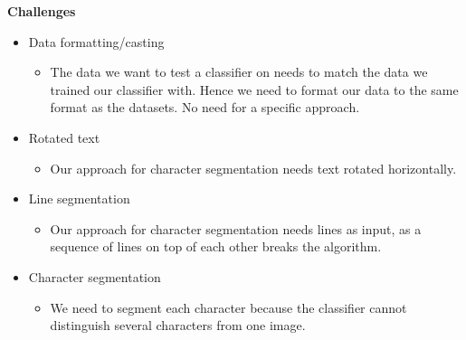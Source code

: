 \documentclass[Report.tex]{subfiles}
\begin{document}
\begin{flushleft}
  \textbf{Challenges}
  \begin{itemize}
    \item{Data formatting/casting}
    \begin{itemize}
      \item{The data we want to test a classifier on needs to match the data we trained our classifier with. Hence we need to format our data to the same format as the datasets. No need for a specific approach.}
    \end{itemize}
    \item{Rotated text}
    \begin{itemize}
      \item{Our approach for character segmentation needs text rotated horizontally.}
    \end{itemize}
      \item{Line segmentation}
    \begin{itemize}
      \item{Our approach for character segmentation needs lines as input, as a sequence of lines on top of each other breaks the algorithm.}
    \end{itemize}
      \item{Character segmentation}
    \begin{itemize}
      \item{We need to segment each character because the classifier cannot distinguish several characters from one image.}
    \end{itemize}
  \end{itemize}
\end{flushleft}
\end{document}
